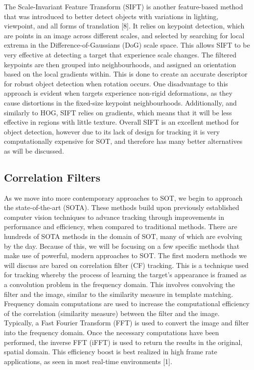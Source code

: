 \documentclass{article}
\begin{document}
The Scale-Invariant Feature Transform (SIFT) is another feature-based method that was introduced to better detect objects with variations in lighting, viewpoint, and all forms of translation [8]. It relies on keypoint detection, which are points in an image across different scales, and selected by searching for local extrema in the Difference-of-Gaussians (DoG) scale space. This allows SIFT to be very effective at detecting a target that experience scale changes. The filtered  keypoints are then grouped into neighbourhoods, and assigned an orientation based on the local gradients within. This is done to create an accurate descriptor for robust object detection when rotation occurs. One disadvantage to this approach is evident when targets experience non-rigid deformations, as they cause distortions in the fixed-size keypoint neighbourhoods. Additionally, and similarly to HOG, SIFT relies on gradients, which means that it will be less effective in regions with little texture. Overall SIFT is an excellent method for object detection, however due to its lack of design for tracking it is very computationally expensive for SOT, and therefore has many better alternatives as will be discussed. 

\subsection{Correlation Filters}

As we move into more contemporary approaches to SOT, we begin to approach the state-of-the-art (SOTA). These methods build upon previously established computer vision techniques to advance tracking through improvements in performance and efficiency, when compared to traditional methods. There are hundreds of SOTA methods in the domain of SOT, many of which are evolving by the day. Because of this, we will be focusing on a few specific methods that make use of powerful, modern approaches to SOT.
The first modern methods we will discuss are bared on correlation filter (CF) tracking. This is a technique used for tracking whereby the process of learning the target's appearance is framed as a convolution problem in the frequency domain. This involves convolving the filter and the image, similar to the similarity measure in template matching. Frequency domain computations are used to increase the computational efficiency of the correlation (similarity measure) between the filter and the image. Typically, a Fast Fourier Transform (FFT) is used to convert the image and filter into the frequency domain. Once the necessary computations have been performed, the inverse FFT (iFFT) is used to return the results in the original, spatial domain. This efficiency boost is best realized in high frame rate applications, as seen in most real-time environments [1].
\end{document}
